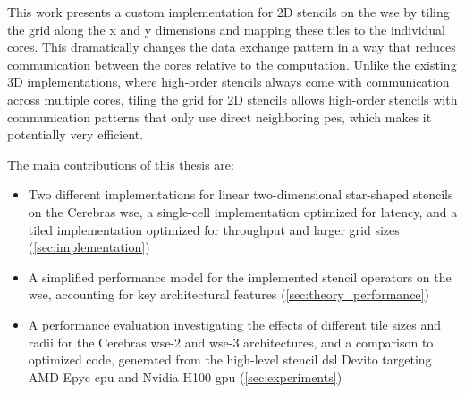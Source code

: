 This work presents a custom implementation for 2D stencils on the \ac{wse} by tiling the grid along the x and y dimensions and mapping these tiles to the individual cores.
This dramatically changes the data exchange pattern in a way that reduces communication between the cores relative to the computation.
Unlike the existing 3D implementations, where high-order stencils always come with communication across multiple cores, tiling the grid for 2D stencils allows high-order stencils with communication patterns that only use direct neighboring \acp{pe}, which makes it potentially very efficient.

The main contributions of this thesis are:
\begin{itemize}
    \item Two different implementations for linear two-dimensional star-shaped stencils on the Cerebras \ac{wse}, a single-cell implementation optimized for latency, and a tiled implementation optimized for throughput and larger grid sizes (\autoref{sec:implementation})
    \item A simplified performance model for the implemented stencil operators on the \ac{wse}, accounting for key architectural features (\autoref{sec:theory_performance})
    \item A performance evaluation investigating the effects of different tile sizes and radii for the Cerebras \ac{wse}-2 and \ac{wse}-3 architectures, and a comparison to optimized code, generated from the high-level stencil \ac{dsl} Devito targeting AMD Epyc \ac{cpu} and Nvidia H100 \ac{gpu} (\autoref{sec:experiments})
\end{itemize}
